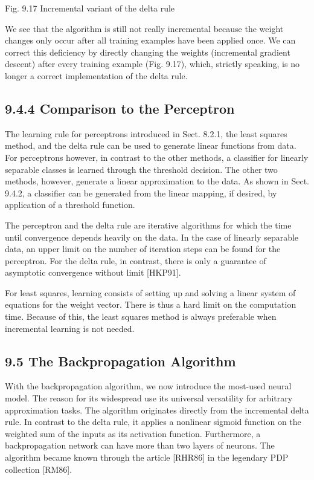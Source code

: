 \documentclass[10pt]{book}
\begin{document}
\begin{center}
\begin{enumerate}
\begin{center}
\begin{center}
\begin{center}
Fig. 9.17 Incremental variant of the delta rule

We see that the algorithm is still not really incremental because the weight changes only occur after all training examples have been applied once. We can correct this deficiency by directly changing the weights (incremental gradient descent) after every training example (Fig. 9.17), which, strictly speaking, is no longer a correct implementation of the delta rule.


\subsection*{9.4.4 Comparison to the Perceptron}
The learning rule for perceptrons introduced in Sect. 8.2.1, the least squares method, and the delta rule can be used to generate linear functions from data. For perceptrons however, in contrast to the other methods, a classifier for linearly separable classes is learned through the threshold decision. The other two methods, however, generate a linear approximation to the data. As shown in Sect. 9.4.2, a classifier can be generated from the linear mapping, if desired, by application of a threshold function.

The perceptron and the delta rule are iterative algorithms for which the time until convergence depends heavily on the data. In the case of linearly separable data, an upper limit on the number of iteration steps can be found for the perceptron. For the delta rule, in contrast, there is only a guarantee of asymptotic convergence without limit [HKP91].

For least squares, learning consists of setting up and solving a linear system of equations for the weight vector. There is thus a hard limit on the computation time. Because of this, the least squares method is always preferable when incremental learning is not needed.

\subsection*{9.5 The Backpropagation Algorithm}
With the backpropagation algorithm, we now introduce the most-used neural model. The reason for its widespread use its universal versatility for arbitrary approximation tasks. The algorithm originates directly from the incremental delta rule. In contrast to the delta rule, it applies a nonlinear sigmoid function on the weighted sum of the inputs as its activation function. Furthermore, a backpropagation network can have more than two layers of neurons. The algorithm became known through the article [RHR86] in the legendary PDP collection [RM86].


\end{center}
\end{center}
\end{center}
\end{enumerate}
\end{center}
\end{document}
